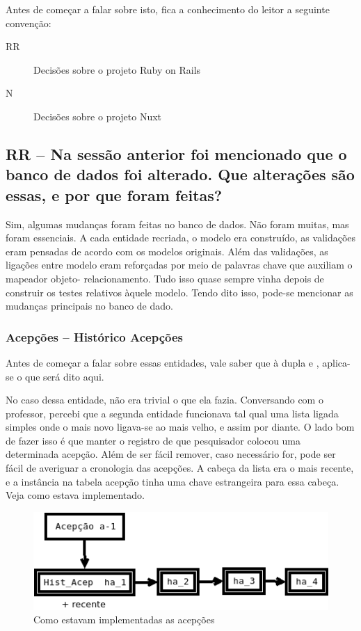 Antes de começar a falar sobre isto, fica a conhecimento do leitor a seguinte convenção:
\begin{description}
    \item[RR] Decisões sobre o projeto Ruby on Rails
    \item[N] Decisões sobre o projeto Nuxt
\end{description}

\subsection{RR -- Na sessão anterior foi mencionado que o banco de dados foi alterado. Que alterações são essas, e por que
foram feitas?} \label{subsec:db-changes}

Sim, algumas mudanças foram feitas no banco de dados. Não foram muitas, mas foram essenciais. A cada entidade
recriada, o modelo era construído, as validações eram pensadas de acordo com os modelos originais. Além das
validações, as ligações entre modelo eram reforçadas por meio de palavras chave que auxiliam o mapeador objeto-
relacionamento. Tudo isso quase sempre vinha depois de construir os testes relativos àquele modelo. Tendo dito
isso, pode-se mencionar as mudanças principais no banco de dado.

\subsubsection{Acepções -- Histórico Acepções}

Antes de começar a falar sobre essas entidades, vale saber que à dupla  e ,
aplica-se o que será dito aqui.

No caso dessa entidade, não era trivial o que ela fazia. Conversando com o professor, percebi que a segunda
entidade funcionava tal qual uma lista ligada simples onde o mais novo ligava-se ao mais velho, e assim por
diante. O lado bom de fazer isso é que manter o registro de que pesquisador colocou uma determinada acepção.
Além de ser fácil remover, caso necessário for, pode ser fácil de averiguar a cronologia das acepções. A cabeça
da lista era o mais recente, e a instância na tabela acepção tinha uma chave estrangeira para essa cabeça. Veja
como estava implementado.

\begin{figure}[htb]
    \centering
    \includegraphics[width=.6\textwidth]{figuras/acep.png}
    \caption{Como estavam implementadas as acepções}
    \label{fig:acep}
\end{figure}

